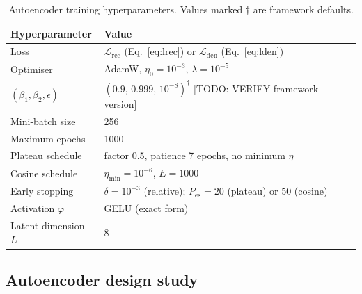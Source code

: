 \begin{table}[t]
  \centering
  \caption{Autoencoder training hyperparameters. Values marked $\dagger$ are framework defaults.}
  \label{tab:hparams}
  \begin{tabular}{ll}
    \toprule
    Hyperparameter & Value \\
    \midrule
    Loss                          & $\mathcal{L}_{\mathrm{rec}}$ (Eq.~\ref{eq:lrec}) or $\mathcal{L}_{\mathrm{den}}$ (Eq.~\ref{eq:lden}) \\
    Optimiser                     & AdamW, $\eta_0=10^{-3}$, $\lambda=10^{-5}$ \\
    $(\beta_1,\beta_2,\epsilon)$  & $(0.9,\,0.999,\,10^{-8})^{\dagger}$ [TODO: VERIFY framework version] \\
    Mini-batch size               & 256 \\
    Maximum epochs                & 1000 \\
    Plateau schedule              & factor 0.5, patience 7 epochs, no minimum $\eta$ \\
    Cosine schedule               & $\eta_{\min}=10^{-6}$, $E=1000$ \\
    Early stopping                & $\delta=10^{-3}$ (relative); $P_{\mathrm{es}}=20$ (plateau) or 50 (cosine) \\
    Activation $\varphi$          & GELU (exact form) \\
    Latent dimension $L$          & 8 \\
    \bottomrule
  \end{tabular}
\end{table}

\subsection{Autoencoder design study}
\label{sec:design}

